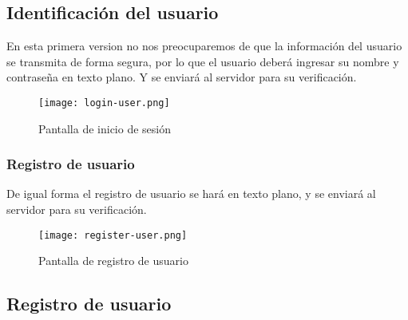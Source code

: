 \subsection{Identificación del usuario}

En esta primera version no nos preocuparemos de que la información del usuario se transmita de forma segura, por lo que el usuario deberá ingresar su nombre y contraseña en texto plano. Y se enviará al servidor para su verificación.

\begin{figure}
    \centering
    \texttt{[image: login-user.png]}
    \caption{Pantalla de inicio de sesión}
\end{figure}

\subsubsection{Registro de usuario}

De igual forma el registro de usuario se hará en texto plano, y se enviará al servidor para su verificación.

\begin{figure}
    \centering
    \texttt{[image: register-user.png]}
    \caption{Pantalla de registro de usuario}
\end{figure}

\subsection{Registro de usuario}

\lipsum[1-2]
